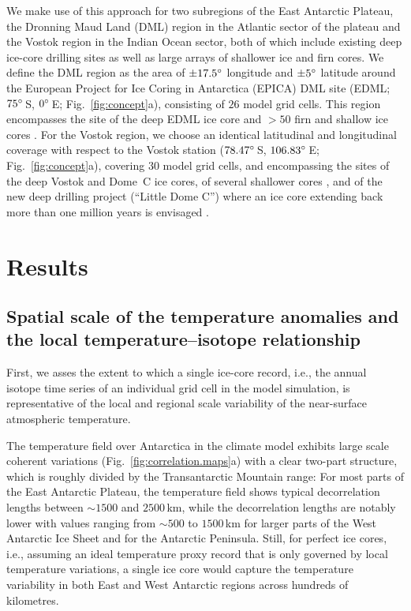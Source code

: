 \documentclass[cp, manuscript]{copernicus}
\begin{document}
We make use of this approach for two subregions of the East Antarctic Plateau,
the Dronning Maud Land (DML) region in the Atlantic sector of the plateau and
the Vostok region in the Indian Ocean sector, both of which include existing
deep ice-core drilling sites as well as large arrays of shallower ice and firn
cores. We define the DML region as the area of $\pm17.5^{\circ}$ longitude and
$\pm5^{\circ}$ latitude around the European Project for Ice Coring in Antarctica
(EPICA) DML site (EDML; $75^{\circ}$\,S, $0^{\circ}$\,E; Fig.~\ref{fig:concept}a),
consisting of $26$ model grid cells. This region encompasses the site of the
deep EDML ice core \citep{EPICAcommunitymembers2006,awi2016} and $>50$ firn and
shallow ice cores \citep{Altnau2015}. For the Vostok region, we choose an
identical latitudinal and longitudinal coverage with respect to the Vostok
station ($78.47^{\circ}$\,S, $106.83^{\circ}$\,E; Fig.~\ref{fig:concept}a),
covering $30$ model grid cells, and encompassing the sites of the deep Vostok
and Dome~C ice cores, of several shallower cores \citep{Stenni2017}, and of the
new deep drilling project (``Little Dome C'') where an ice core extending back
more than one million years is envisaged \citep{Passalacqua2018}.

\section{Results}\label{results}

\subsection{Spatial scale of the temperature anomalies and the local
  temperature--isotope relationship}
\label{results:t2m-iso}

First, we asses the extent to which a single ice-core record, i.e., the annual
isotope time series of an individual grid cell in the model simulation, is
representative of the local and regional scale variability of the near-surface
atmospheric temperature.

The temperature field over Antarctica in the climate model exhibits large scale
coherent variations (Fig.~\ref{fig:correlation.maps}a) with a clear two-part
structure, which is roughly divided by the Transantarctic Mountain range: For
most parts of the East Antarctic Plateau, the temperature field shows typical
decorrelation lengths between $\sim1500$ and $2500$\,km, while the decorrelation
lengths are notably lower with values ranging from $\sim500$ to $1500$\,km for
larger parts of the West Antarctic Ice Sheet and for the Antarctic Peninsula.
Still, for perfect ice cores, i.e., assuming an ideal temperature proxy record
that is only governed by local temperature variations, a single ice core would
capture the temperature variability in both East and West Antarctic regions
across hundreds of kilometres.
\end{document}
